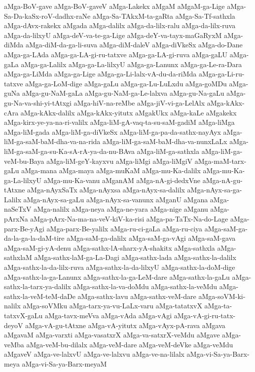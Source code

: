 {aMga-BoV-gave
aMga-BoV-gaveV
aMga-Lakekx
aMgaM
aMgaM-ga-Lige
aMga-Sa-Da-kaSx-roV-dadhx-raNe
aMga-Sa-TAkxM-ta-gaRta
aMga-Sa-Tf-sathxla
aMga-dAvx-rakekx
aMgada
aMga-dalilx
aMga-da-lilx-ralu
aMga-da-lilx-ruva
aMga-da-lilxyU
aMga-deV-va-te-ga-Lige
aMga-deY-va-tayx-maGaRyxM
aMga-diMda
aMga-diM-da-ga-li-suva
aMga-diM-daleV
aMga-diVkeSx
aMga-do-Dane
aMga-ga-LAda
aMga-ga-LA-gi-ru-tatxve
aMga-ga-LA-gi-ruva
aMga-gaLU
aMga-gaLa
aMga-ga-Lalilx
aMga-ga-La-lilxyU
aMga-ga-Lanunx
aMga-ga-Le-ra-Dara
aMga-ga-LiMda
aMga-ga-Lige
aMga-ga-Li-lalx-vA-du-da-riMda
aMga-ga-Li-ru-tatxve
aMga-ga-LoM-dige
aMga-gaLu
aMga-ga-Lu-LuLxdu
aMga-goMDu
aMga-guNa
aMga-gu-NaM-gaLa
aMga-gu-NaM-ga-Le-lalxva
aMga-gu-Na-gaLu
aMga-gu-Na-va-shi-yi-tAtxgi
aMga-hiV-na-reMbe
aMga-jiV-vi-ga-LelAlx
aMga-kAkx-cAra
aMga-kAkx-dalilx
aMga-kAkx-yitutx
aMgakUkx
aMga-kaLe
aMgakekx
aMga-kirx-ye-ya-na-ri-valilx
aMga-liM-gA-vaq-ta-su-saM-gadiM
aMga-liMga
aMga-liM-gada
aMga-liM-ga-diVkeSx
aMga-liM-ga-pa-da-sathx-nayAyx
aMga-liM-ga-saM-baM-dha-va-na-rida
aMga-liM-ga-saM-baM-dha-va-nunxLaLx
aMga-liM-ga-saM-ga-su-Ka-sA-rA-ya-da-nu-BAva
aMga-liM-ga-sathxla
aMga-liM-ga-veM-bu-Baya
aMga-liM-geY-kayxvu
aMga-liMgi
aMga-liMgiV
aMga-maM-tarx-gaLu
aMga-mana
aMga-maya
aMga-muKaM
aMga-mu-Ka-dalilx
aMga-mu-Ka-ga-La-lilxyU
aMga-mu-Ka-vanu
aMganAM
aMga-nA-gi-dedxVne
aMga-nA-gu-tAtxne
aMga-nAyxSaTx
aMga-nAyxsa
aMga-nAyx-sa-dalilx
aMga-nAyx-sa-ga-Lalilx
aMga-nAyx-sa-gaLu
aMga-nAyx-sa-vanunx
aMganU
aMgana
aMga-naSeTxV
aMga-nalilx
aMga-neya
aMga-ne-yara
aMga-nige
aMganu
aMga-pArxNa
aMga-pArx-Na-ma-na-veV-kiV-ka-risi
aMga-pa-TaTx-Na-do-Lage
aMga-parx-Be-yAgi
aMga-parx-Be-yalilx
aMga-ru-ci-gaLa
aMga-ru-ciya
aMga-saM-ga-da-la-ga-la-daM-tire
aMga-saM-ga-dalilx
aMga-saM-ga-vAgi
aMga-saM-gava
aMga-saM-gi-yA-denu
aMga-sathx-lA-sharx-yA-shakitx
aMga-sathxla
aMga-sathxlaM
aMga-sathx-laM-ga-La-Dagi
aMga-sathx-lada
aMga-sathx-la-dalilx
aMga-sathx-la-da-lilx-ruva
aMga-sathx-la-da-lilxyU
aMga-sathx-la-doM-dige
aMga-sathx-la-ga-Lanunx
aMga-sathx-la-ga-LeM-dare
aMga-sathx-la-gaLu
aMga-sathx-la-tarx-ya-dalilx
aMga-sathx-la-va-doMdu
aMga-sathx-la-veMdu
aMga-sathx-la-veM-teM-daDe
aMga-sathx-lavu
aMga-sathx-veM-dare
aMga-soVM-ki-nalilx
aMga-soVMku
aMga-tarx-ya-vu-LaLx-varu
aMga-tatatxvX
aMga-ta-tatxvX-gaLu
aMga-tavx-meVva
aMga-vAda
aMga-vAgi
aMga-vA-gi-ru-tatx-deyoV
aMga-vA-gu-tAtxne
aMga-vA-yitutx
aMga-vAyx-pA-rava
aMgava
aMgavaM
aMga-varxti
aMga-vasatxrX
aMga-va-satxrX-veMdu
aMgave
aMga-veMba
aMga-veM-bu-dilalx
aMga-veM-dare
aMga-veM-deVke
aMga-veMdu
aMgaveV
aMga-ve-lalxvU
aMga-ve-lalxvu
aMga-ve-na-lilalx
aMga-vi-Sa-ya-Barx-meya
aMga-vi-Sa-ya-Barx-meyaM
}
